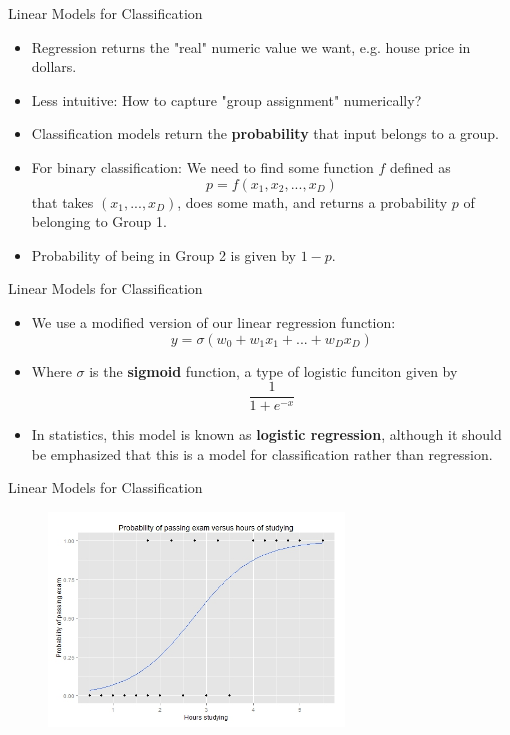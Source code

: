 \begin{frame}{Linear Models for Classification}
\begin{itemize}
    \item Regression returns the "real" numeric value we want, e.g. house price in dollars.
    \item Less intuitive: How to capture "group assignment" numerically? 
    \item Classification models return the \textbf{probability} that input belongs to a group.
    \item For binary classification: We need to find some function $f$ defined as $$p = f(x_1, x_2, ..., x_D)$$ that takes $(x_1, ..., x_D)$, does some math, and returns a probability $p$ of belonging to Group 1.
    \item Probability of being in Group 2 is given by $1-p$.
\end{itemize}
\end{frame}

\begin{frame}{Linear Models for Classification}
\begin{itemize}
    \item We use a modified version of our linear regression function:
    $$y = \sigma(w_0 + w_1x_1 + ... + w_Dx_D)$$
    \item Where $\sigma$ is the \textbf{sigmoid} function, a type of logistic funciton given by
    $$\frac{1}{1 + e^{-x}}$$
    \item In statistics, this model is known as \textbf{logistic regression}, although it should be emphasized that this is a model for classification rather than regression.
\end{itemize}
\end{frame}

\begin{frame}{Linear Models for Classification}
\begin{figure}
    \centering
    \includegraphics[width=0.7\textwidth]{img/Exam_pass_logistic_curve.jpeg}
\end{figure}
\end{frame}
